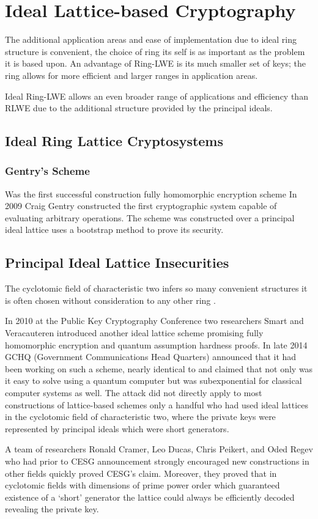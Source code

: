 \section{Ideal Lattice-based Cryptography}
The additional application areas and ease of implementation due to ideal ring structure is convenient, the choice of ring its self is as important as the problem it is based upon. An advantage of Ring-LWE is its much smaller set of keys; the ring allows for more efficient and larger ranges in application areas. 

Ideal Ring-LWE allows an even broader range of applications and efficiency than RLWE due to the additional structure provided by the principal ideals.

\subsection{Ideal Ring Lattice Cryptosystems}

\subsubsection*{Gentry's Scheme}
\cite{Gen20090} Was the first successful construction fully homomorphic encryption scheme In 2009 Craig Gentry constructed the first cryptographic system capable of evaluating arbitrary operations. The scheme was constructed over a principal ideal lattice \cite{Gen20090} uses a bootstrap method to prove its security.



\subsection{Principal Ideal Lattice Insecurities}

The cyclotomic field of characteristic two infers so many convenient structures it is often chosen without consideration to any other ring \cite{Cra20150}.

In 2010 at the Public Key Cryptography Conference two researchers Smart and Veracauteren \cite{Sma2010} introduced another ideal lattice scheme promising fully homomorphic encryption and quantum assumption hardness proofs. In late 2014 GCHQ (Government Communications Head Quarters) announced that it had been working on such a scheme, nearly identical to \cite{Sma2010} and claimed that not only was it easy to solve using a quantum computer but was subexponential for classical computer systems as well. The attack did not directly apply to most constructions of lattice-based schemes only a handful who had used ideal lattices in the cyclotomic field of characteristic two, where the private keys were represented by principal ideals which were short generators. 

A team of researchers Ronald Cramer, Leo Ducas, Chris Peikert, and Oded Regev \cite{Cra15} who had prior to CESG announcement strongly encouraged new constructions in other fields quickly proved CESG’s claim. Moreover, they proved that in cyclotomic fields with dimensions of prime power order which guaranteed existence of a ‘short’ generator the lattice could always be efficiently decoded revealing the private key.
